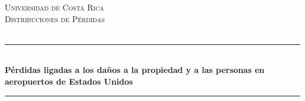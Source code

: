 %
%
%
% 


	\newcommand{\HRule}{\rule{\linewidth}{0.5mm}} %
	
	\center %
	
	
	\textsc{\LARGE Universidad de Costa Rica}\\[1.5cm] %
	
	\textsc{\Large Distribuciones de Pérdidas}\\[0.5cm] %
	
	\textsc{\large }\\[0.5cm] %
	
	
	\HRule\\[0.4cm]
	
	{\huge\bfseries Pérdidas ligadas a los daños a la propiedad y a las personas en aeropuertos de Estados Unidos }\\[0.4cm] %
	
	\HRule\\[1.5cm]
	
	
	
